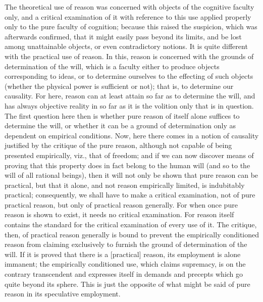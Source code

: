 \documentclass[12pt]{article}
\begin{document}
The theoretical use of reason was concerned with objects of the
cognitive faculty only, and a critical examination of it with
reference to this use applied properly only to the pure faculty of
cognition; because this raised the suspicion, which was afterwards
confirmed, that it might easily pass beyond its limits, and be lost
among unattainable objects, or even contradictory notions. It is quite
different with the practical use of reason. In this, reason is
concerned with the grounds of determination of the will, which is a
faculty either to produce objects corresponding to ideas, or to
determine ourselves to the effecting of such objects (whether the
physical power is sufficient or not); that is, to determine our
causality. For here, reason can at least attain so far as to determine
the will, and has always objective reality in so far as it is the
volition only that is in question. The first question here then is
whether pure reason of itself alone suffices to determine the will, or
whether it can be a ground of determination only as dependent on
empirical conditions. Now, here there comes in a notion of causality
justified by the critique of the pure reason, although not capable
of being presented empirically, viz., that of freedom; and if we can
now discover means of proving that this property does in fact belong
to the human will (and so to the will of all rational beings), then it
will not only be shown that pure reason can be practical, but that
it alone, and not reason empirically limited, is indubitably
practical; consequently, we shall have to make a critical examination,
not of pure practical reason, but only of practical reason
generally. For when once pure reason is shown to exist, it needs no
critical examination. For reason itself contains the standard for
the critical examination of every use of it. The critique, then, of
practical reason generally is bound to prevent the empirically
conditioned reason from claiming exclusively to furnish the ground
of determination of the will. If it is proved that there is a
[practical] reason, its employment is alone immanent; the
empirically conditioned use, which claims supremacy, is on the
contrary transcendent and expresses itself in demands and precepts
which go quite beyond its sphere. This is just the opposite of what
might be said of pure reason in its speculative employment.
\end{document}
